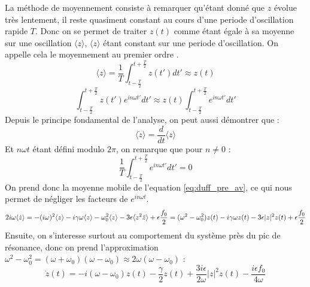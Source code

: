 La méthode de moyennement consiste à remarquer qu'étant donné que $z$ évolue très lentement, 
il reste quasiment constant au cours d'une periode d'oscillation rapide $T$. 
Donc on se permet de traiter $z(t)$ comme étant égale à sa moyenne sur une oscillation $\langle z \rangle$, $\langle z \rangle$ étant constant sur une periode d'oscillation. 
On appelle cela le moyennement au premier ordre \cite{rand_lecture_nodate}.
%
\begin{equation}
    \langle z \rangle = \frac{1}{T}\int_{t-\frac{T}{2}}^{t+\frac{T}{2}}{z(t')}dt' \approx  z(t)
\end{equation}
\begin{equation}
    \int_{t-\frac{T}{2}}^{t+\frac{T}{2}}{z(t')e^{in\omega t'}}dt'  \approx z(t) \int_{t-\frac{T}{2}}^{t+\frac{T}{2}}{e^{in\omega t'}}dt'
\end{equation}
%
Depuis le principe fondamental de l'analyse, on peut aussi démontrer que :
%
\begin{equation}
    \langle \dot{z} \rangle = \frac{d}{dt} \langle z \rangle
\end{equation}
%
Et $n \omega t$ étant défini modulo $2\pi$, on remarque que pour $n \neq 0$ :
\begin{equation*}
    \frac{1}{T}\int_{t-\frac{T}{2}}^{t+\frac{T}{2}}{e^{in\omega t'}}dt' = 0
\end{equation*}
%
On prend donc la moyenne mobile de l'equation \eqref{eq:duff_pre_av}, 
ce qui nous permet de négliger les facteurs de $e^{i n\omega t}$.
\begin{dmath}
    2i\omega \langle \dot{z} \rangle = - (i\omega)^2 \langle z \rangle
    - i\gamma\omega \langle z \rangle
    - \omega_0^2 \langle z \rangle 
    - 3 \epsilon \langle z^2 \bar{z} \rangle
    + \epsilon \frac{f_0}{2} \\
    = (\omega^2 - \omega_0^2)z(t) - i\gamma\omega z(t) - 3\epsilon |z|^2 z(t) + \epsilon \frac{f_0}{2}
\end{dmath}
%
Ensuite, on s'interesse surtout au comportement du système près du pic de résonance, 
donc on prend l'approximation $\omega^2 - \omega_0^2 = (\omega + \omega_0)(\omega - \omega_0) \approx 2\omega(\omega - \omega_0)$ :
%
\begin{dmath}
    \dot{z}(t) = -i(\omega - \omega_0)z(t)
    - \frac{\gamma}{2} z(t) + \frac{3i\epsilon}{2\omega}|z|^2z(t) - \frac{i\epsilon f_0}{4\omega}
\end{dmath}
%

